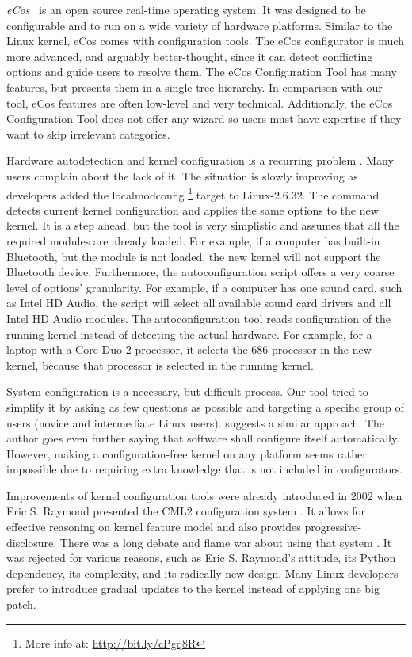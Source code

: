 \documentclass{chi2009}
\begin{document}
\textit{eCos}~\cite{veer:ecos:2000} is an open source real-time operating system. It was designed to be configurable and to run on a wide variety of hardware
platforms. Similar to the Linux kernel, eCos comes with configuration tools. The eCos configurator is much more advanced, and arguably better-thought, since
it can detect conflicting options and guide users to resolve them. The eCos Configuration Tool has many features, but presents them in a single tree hierarchy.
In comparison with our tool, eCos features are often low-level and very technical. Additionaly, the eCos Configuration Tool does not offer any wizard so users
must have expertise if they want to skip irrelevant categories.

Hardware autodetection and kernel configuration is a recurring problem \cite{debian:config:2010,soft32:config:2007}. Many users complain about the lack of it.
The situation is slowly improving as developers added the \textsf{localmodconfig} \footnote{More info at: \url{http://bit.ly/cPgq8R}} target to Linux-2.6.32.
The command detects current kernel configuration and applies the same options to the new kernel. It is a step ahead, but the tool is very simplistic and assumes
that all the required modules are already loaded. For example, if a computer has built-in Bluetooth, but the module is not loaded, the new kernel will not
support the Bluetooth device. Furthermore, the autoconfiguration script offers a very coarse level of options' granularity. For example, if a computer has one
sound card, such as Intel HD Audio, the script will select all available sound card drivers and all Intel HD Audio modules. The autoconfiguration tool reads
configuration of the running kernel instead of detecting the actual hardware. For example, for a laptop with a Core Duo 2 processor, it selects the 686
processor in the new kernel, because that processor is selected in the running kernel.

System configuration is a necessary, but difficult process. Our tool tried to simplify it by asking as few questions as possible and targeting a specific group
of users (novice and intermediate Linux users). \cite{spillers:config:2010} suggests a similar approach. The author goes even further saying that software shall
configure itself automatically. However, making a configuration-free kernel on any platform seems rather impossible due to requiring extra knowledge that is not
included in configurators.

Improvements of kernel configuration tools were already introduced in 2002 when Eric S. Raymond presented the CML2 configuration system
\cite{raymond:cml2:2000}. It allows for effective reasoning on kernel feature model and also provides progressive-disclosure. There was a long debate and flame
war about using that system \cite{kerneltrap:linux:2002}. It was rejected for various reasons, such as Eric S. Raymond's attitude, its Python dependency, its
complexity, and its radically new design. Many Linux developers prefer to introduce gradual updates to the kernel instead of applying one big patch.
\end{document}
